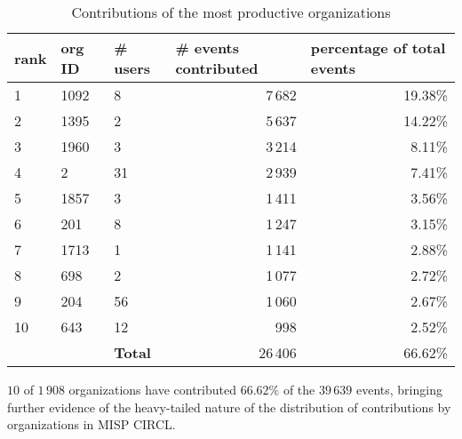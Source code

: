 \documentclass[unnumsec,webpdf,contemporary,large]{oup-authoring-template}%
\theoremstyle{thmstyleone}%
\theoremstyle{thmstyletwo}%
\theoremstyle{thmstylethree}%
\begin{document}
\begin{table}[!ht]
    \centering
\caption{Contributions of the most productive organizations}
\begin{tabular}{|l|l|l|r|r|}
\hline
rank & org ID & \# users        & \multicolumn{1}{l|}{\# events contributed} & \multicolumn{1}{l|}{percentage of total events} \\ \hline
1    & 1092   & 8          & 7\,682                                     & 19.38\%                                         \\
2    & 1395   & 2              & 5\,637                                     & 14.22\%                                         \\
3    & 1960   & 3          & 3\,214                                     & 8.11\%                                          \\
4    & 2      & 31             & 2\,939                                     & 7.41\%                                          \\
5    & 1857   & 3          & 1\,411                                     & 3.56\%                                          \\
6    & 201    & 8              & 1\,247                                     & 3.15\%                                          \\
7    & 1713   & 1              & 1\,141                                     & 2.88\%                                          \\
8    & 698    & 2          & 1\,077                                     & 2.72\%                                          \\
9    & 204    & 56         & 1\,060                                     & 2.67\%                                          \\
10   & 643    & 12             & 998                                       & 2.52\%                                          \\ \hline
     &        & \textbf{Total} & 26\,406                                    & 66.62\%                                         \\ \hline
\end{tabular}
\begin{tablenotes}
\item $10$ of $1\,908$ organizations have contributed  $66.62\%$ of the $39\,639$ events, bringing further evidence of the heavy-tailed nature of the distribution of contributions by organizations in MISP CIRCL.
\end{tablenotes}
\label{tab:top_10_contributors}
\end{table}
\end{document}
